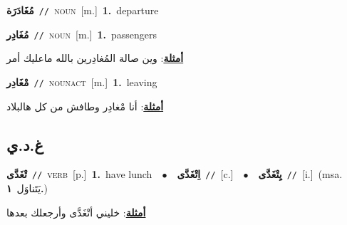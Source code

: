 \documentclass[10pt,a4paper,twoside]{article} %
\begin{document}
\begin{multicols}{2}
{\setlength\topsep{0pt}\textbf{\foreignlanguage{arabic}{مُغَادَرَة}}\ {\color{gray}\texttt{//}\color{black}}\ \textsc{noun}\ [m.]\ \textbf{1.}~departure\ } \vspace{2mm}

{\setlength\topsep{0pt}\textbf{\foreignlanguage{arabic}{مُغَادِر}}\ {\color{gray}\texttt{//}\color{black}}\ \textsc{noun}\ [m.]\ \textbf{1.}~passengers\  \begin{flushright}\color{gray}\foreignlanguage{arabic}{\textbf{\underline{\foreignlanguage{arabic}{أمثلة}}}: وين صالة المُغادِرين بالله ماعليك أمر}\end{flushright}\color{black}} \vspace{2mm}

{\setlength\topsep{0pt}\textbf{\foreignlanguage{arabic}{مْغَادِر}}\ {\color{gray}\texttt{//}\color{black}}\ \textsc{noun\textunderscore act}\ [m.]\ \textbf{1.}~leaving\  \begin{flushright}\color{gray}\foreignlanguage{arabic}{\textbf{\underline{\foreignlanguage{arabic}{أمثلة}}}: أنا مْغادِر وطافش من كل هالبلاد}\end{flushright}\color{black}} \vspace{2mm}

\vspace{-3mm}
\subsection*{\color{blue}\foreignlanguage{arabic}{غ.د.ي}\color{blue}{}} 

{\setlength\topsep{0pt}\textbf{\foreignlanguage{arabic}{تْغَدَّى}}\ {\color{gray}\texttt{//}\color{black}}\ \textsc{verb}\ [p.]\ \textbf{1.}~have lunch\ \ $\bullet$\ \ \setlength\topsep{0pt}\textbf{\foreignlanguage{arabic}{اِتْغَدَّى}}\ {\color{gray}\texttt{//}\color{black}}\ [c.]\ \ $\bullet$\ \ \setlength\topsep{0pt}\textbf{\foreignlanguage{arabic}{يِتْغَدَّى}}\ {\color{gray}\texttt{//}\color{black}}\ [i.]\ \color{gray}(msa. \foreignlanguage{arabic}{يَتَناوَل}~\foreignlanguage{arabic}{\textbf{١.}})\color{black}\  \begin{flushright}\color{gray}\foreignlanguage{arabic}{\textbf{\underline{\foreignlanguage{arabic}{أمثلة}}}: خليني أتْغَدَّى وأرجعلك بعدها}\end{flushright}\color{black}} \vspace{2mm}


\end{multicols}
\end{document}
